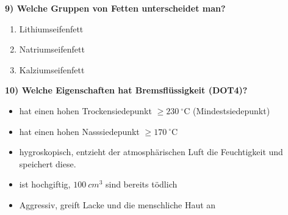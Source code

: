 \textbf{9) Welche Gruppen von Fetten unterscheidet man?}

\begin{enumerate}
\item
  Lithiumseifenfett
\item
  Natriumseifenfett
\item
  Kalziumseifenfett
\end{enumerate}

\textbf{10) Welche Eigenschaften hat Bremsflüssigkeit (DOT4)?}

\begin{itemize}
\item
  hat einen hohen Trockensiedepunkt $\geq 230~^\circ\text{C}$
  (Mindestsiedepunkt)
\item
  hat einen hohen Nasssiedepunkt $\geq 170~^\circ\text{C}$
\item
  hygroskopisch, entzieht der atmosphärischen Luft die Feuchtigkeit und
  speichert diese.
\item
  ist hochgiftig, $100~cm^3$ sind bereits tödlich
\item
  Aggressiv, greift Lacke und die menschliche Haut an
\end{itemize}
